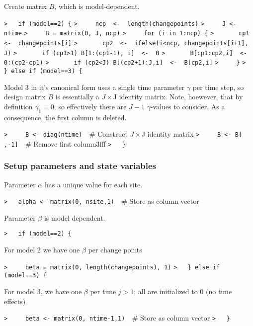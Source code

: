 \documentclass[a4paper]{article}
\begin{document}
Create matrix $B$, which is model-dependent.\par
\verb~>   if (model==2) {~\newline
\verb~>     ncp  <-  length(changepoints)~\newline
\verb~>     J <- ntime~\newline
\verb~>     B = matrix(0, J, ncp)~\newline
\verb~>     for (i in 1:ncp) {~\newline
\verb~>       cp1  <-  changepoints[i]~\newline
\verb~>       cp2  <-  ifelse(i<ncp, changepoints[i+1], J)~\newline
\verb~>       if (cp1>1) B[1:(cp1-1), i]  <-  0~\newline
\verb~>       B[cp1:cp2,i]  <-  0:(cp2-cp1)~\newline
\verb~>       if (cp2<J) B[(cp2+1):J,i]  <-  B[cp2,i]~\newline
\verb~>     }~\newline
\verb~>   } else if (model==3) {~\par
Model 3 in it's canonical form uses a single time parameter $\gamma$ per time step,
so design matrix $B$ is essentially a $J\times$J identity matrix.
Note, hoewever, that by definition $\gamma_1=0$, so effectively there are $J-1$ $\gamma$-values to consider.
As a consequence, the first column is deleted.\par
\verb~>     B <- diag(ntime)  ~{\sffamily\# Construct $J\times$J identity matrix}\newline
\verb~>     B <- B[ ,-1]  ~{\sffamily\# Remove first column3fff}\newline
\verb~>   }~\par



\subsubsection{Setup parameters and state variables}\par

Parameter $\alpha$ has a unique value for each site.\par
\verb~>   alpha <- matrix(0, nsite,1)  ~{\sffamily\# Store as column vector}\par

Parameter $\beta$ is model dependent.\par
\verb~>   if (model==2) {~\par
For model 2 we have one $\beta$ per change points\par
\verb~>     beta = matrix(0, length(changepoints), 1)~\newline
\verb~>   } else if (model==3) {~\par
For model 3, we have one $\beta$ per time $j>1$; all are initialized to 0 (no time effects)\par
\verb~>     beta <- matrix(0, ntime-1,1)  ~{\sffamily\# Store as column vector}\newline
\verb~>   }~\par
\end{document}
